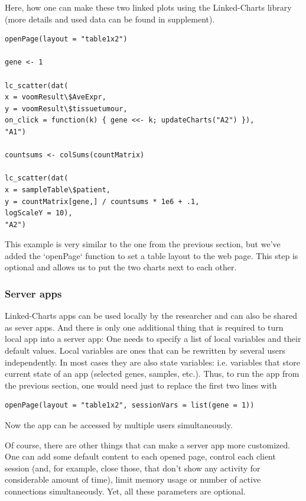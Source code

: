 \documentclass[twocolumn,10pt]{article}
\begin{document}
Here, how one can make these two linked plots using the Linked-Charts library (more details and used data can be found in supplement).

\begin{verbatim}
openPage(layout = "table1x2")

gene <- 1

lc_scatter(dat(
x = voomResult\$AveExpr,
y = voomResult\$tissuetumour,
on_click = function(k) { gene <<- k; updateCharts("A2") }),
"A1")

countsums <- colSums(countMatrix)

lc_scatter(dat(
x = sampleTable\$patient,
y = countMatrix[gene,] / countsums * 1e6 + .1,
logScaleY = 10),
"A2")
\end{verbatim}

This example is very similar to the one from the previous section, but we've added the `openPage` function to set a table layout to the web page. This step is optional and allows us to put the two charts next to each other.

\subsubsection{Server apps}
Linked-Charts apps can be used locally by the researcher and can also be shared as sever apps. And there is only one additional thing that is required to turn local app into a server app: One needs to specify a list of local variables and their default values. Local variables are ones that can be rewritten by several users independently. In most cases they are also state variables: i.e. variables that store current state of an app (selected genes, samples, etc.). Thus, to run the app from the previous section, one would need just to replace the first two lines with
\begin{verbatim}
openPage(layout = "table1x2", sessionVars = list(gene = 1))
\end{verbatim}

Now the app can be accessed by multiple users simultaneously.

Of course, there are other things that can make a server app more customized. One can add some default content to each opened page, control each client session (and, for example, close those, that don't show any activity for considerable amount of time), limit memory usage or number of active connections simultaneously. Yet, all these parameters are optional.
\end{document}
